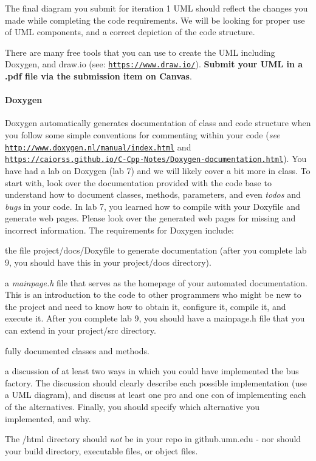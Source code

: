 The final diagram you submit for iteration 1 U\+ML should reflect the changes you made while completing the code requirements. We will be looking for proper use of U\+ML components, and a correct depiction of the code structure.

There are many free tools that you can use to create the U\+ML including Doxygen, and draw.\+io (see\+: \href{https://www.draw.io/}{\tt https\+://www.\+draw.\+io/}). {\bfseries Submit your U\+ML in a .pdf file via the submission item on Canvas}.

\paragraph*{Doxygen}

Doxygen automatically generates documentation of class and code structure when you follow some simple conventions for commenting within your code ({\itshape see} \href{http://www.doxygen.nl/manual/index.html}{\tt http\+://www.\+doxygen.\+nl/manual/index.\+html} and \href{https://caiorss.github.io/C-Cpp-Notes/Doxygen-documentation.html}{\tt https\+://caiorss.\+github.\+io/\+C-\/\+Cpp-\/\+Notes/\+Doxygen-\/documentation.\+html}). You have had a lab on Doxygen (lab 7) and we will likely cover a bit more in class. To start with, look over the documentation provided with the code base to understand how to document classes, methods, parameters, and even {\itshape todo\textquotesingle{}s} and {\itshape bugs} in your code. In lab 7, you learned how to compile with your Doxyfile and generate web pages. Please look over the generated web pages for missing and incorrect information. The requirements for Doxygen include\+:


\begin{DoxyItemize}
\item the file {\ttfamily project/docs/\+Doxyfile} to generate documentation (after you complete lab 9, you should have this in your {\ttfamily project/docs} directory).
\item a {\itshape mainpage.\+h} file that serves as the homepage of your automated documentation. This is an introduction to the code to other programmers who might be new to the project and need to know how to obtain it, configure it, compile it, and execute it. After you complete lab 9, you should have a mainpage.\+h file that you can extend in your {\ttfamily project/src} directory.
\item fully documented classes and methods.
\item a discussion of at least two ways in which you could have implemented the bus factory. The discussion should clearly describe each possible implementation (use a U\+ML diagram), and discuss at least one pro and one con of implementing each of the alternatives. Finally, you should specify which alternative you implemented, and why.
\item The /html directory should {\itshape not} be in your repo in github.\+umn.\+edu -\/ nor should your build directory, executable files, or object files.
\end{DoxyItemize}

